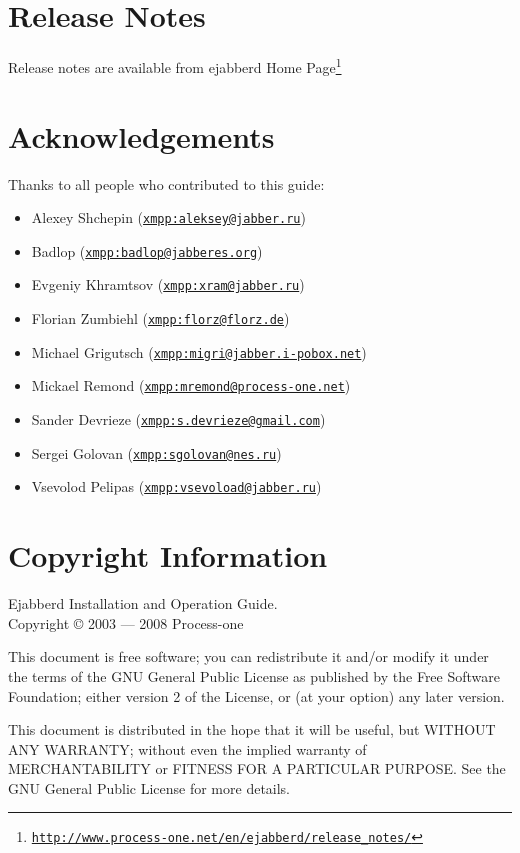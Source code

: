 \documentclass[a4paper,10pt]{book}
\newcommand{\ind}[1]{\begin{latexonly}\index{#1}\end{latexonly}}
\gdef\ahrefurl#1{\href{#1}{\texttt{#1}}}
\gdef\footahref#1#2{#2\footnote{\href{#1}{\texttt{#1}}}}
\begin{document}
\chapter{Release Notes}
\label{releasenotes}
\ind{release notes}

Release notes are available from \footahref{http://www.process-one.net/en/ejabberd/release\_notes/}{ejabberd Home Page}

\chapter{Acknowledgements}
\label{acknowledgements}
Thanks to all people who contributed to this guide:
\begin{itemize}
\item Alexey Shchepin (\ahrefurl{xmpp:aleksey@jabber.ru})
\item Badlop (\ahrefurl{xmpp:badlop@jabberes.org})
\item Evgeniy Khramtsov (\ahrefurl{xmpp:xram@jabber.ru})
\item Florian Zumbiehl (\ahrefurl{xmpp:florz@florz.de})
\item Michael Grigutsch (\ahrefurl{xmpp:migri@jabber.i-pobox.net})
\item Mickael Remond (\ahrefurl{xmpp:mremond@process-one.net})
\item Sander Devrieze (\ahrefurl{xmpp:s.devrieze@gmail.com})
\item Sergei Golovan (\ahrefurl{xmpp:sgolovan@nes.ru})
\item Vsevolod Pelipas (\ahrefurl{xmpp:vsevoload@jabber.ru})
\end{itemize}


\chapter{Copyright Information}
\label{copyright}

Ejabberd Installation and Operation Guide.\\
Copyright \copyright{} 2003 --- 2008 Process-one

This document is free software; you can redistribute it and/or
modify it under the terms of the GNU General Public License
as published by the Free Software Foundation; either version 2
of the License, or (at your option) any later version.

This document is distributed in the hope that it will be useful,
but WITHOUT ANY WARRANTY; without even the implied warranty of
MERCHANTABILITY or FITNESS FOR A PARTICULAR PURPOSE. See the
GNU General Public License for more details.
\end{document}

